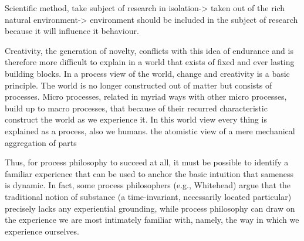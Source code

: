 Scientific method, take subject of research in isolation-> taken out of the rich natural environment-> environment should be included in the subject of research because it will influence it behaviour.

Creativity, the generation of novelty, conflicts with this idea of endurance and is therefore more difficult to explain in a world that exists of fixed and ever lasting building blocks.
In a process view of the world, change and creativity is a basic principle. The world is no longer constructed out of matter but consists of processes. Micro processes, related in myriad ways with other micro processes, build up to macro processes, that because of their recurred characteristic construct the world as we experience it. In this world view every thing is explained as a process, also we humans. 
\cite[ch 5]{rapp1990whitehead}
the atomistic view of a mere mechanical aggregation of parts

Thus, for process philosophy to succeed at all, it must be possible to identify a familiar experience that can be used to anchor the basic intuition that sameness is dynamic. In fact, some process philosophers (e.g., Whitehead) argue that the traditional notion of substance (a time-invariant, necessarily located particular) precisely lacks any experiential grounding, while process philosophy can draw on the experience we are most intimately familiar with, namely, the way in which we experience ourselves.

